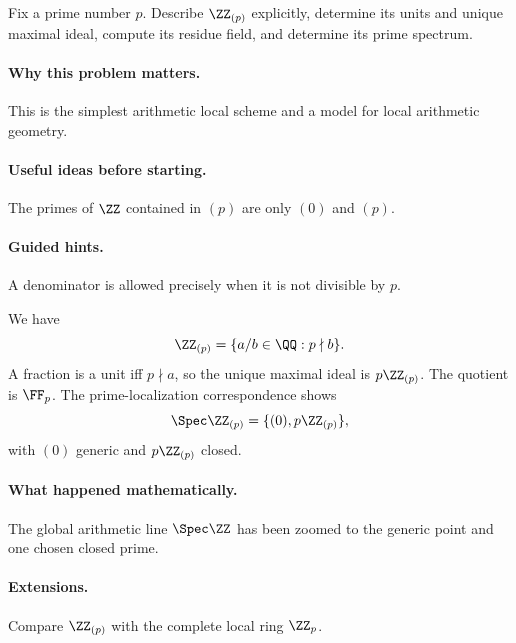 \begin{problem}
Fix a prime number $p$.  Describe $\ZZ_{(p)}$ explicitly, determine its units and unique maximal ideal, compute its residue field, and determine its prime spectrum.
\end{problem}

\paragraph{Why this problem matters.}
This is the simplest arithmetic local scheme and a model for local arithmetic geometry.

\paragraph{Useful ideas before starting.}
The primes of $\ZZ$ contained in $(p)$ are only $(0)$ and $(p)$.

\paragraph{Guided hints.}
A denominator is allowed precisely when it is not divisible by $p$.

\begin{solution}
We have
\[
\ZZ_{(p)}=\{a/b\in\QQ:p\nmid b\}.
\]
A fraction is a unit iff $p\nmid a$, so the unique maximal ideal is $p\ZZ_{(p)}$.  The quotient is $\FF_p$.  The prime-localization correspondence shows
\[
\Spec\ZZ_{(p)}=\{(0),p\ZZ_{(p)}\},
\]
with $(0)$ generic and $p\ZZ_{(p)}$ closed.
\end{solution}

\paragraph{What happened mathematically.}
The global arithmetic line $\Spec\ZZ$ has been zoomed to the generic point and one chosen closed prime.

\paragraph{Extensions.}
Compare $\ZZ_{(p)}$ with the complete local ring $\ZZ_p$.
